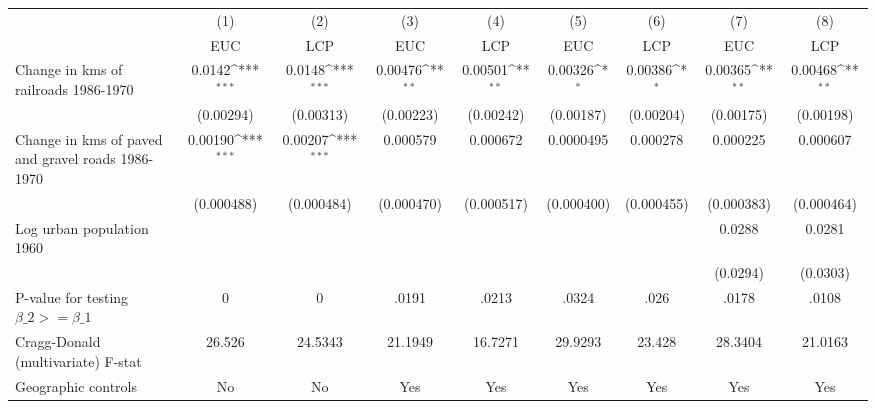 {
\def\sym#1{\ifmmode^{#1}\else\(^{#1}\)\fi}
\begin{tabular}{l*{8}{c}}
\hline\hline
                &\multicolumn{1}{c}{(1)}&\multicolumn{1}{c}{(2)}&\multicolumn{1}{c}{(3)}&\multicolumn{1}{c}{(4)}&\multicolumn{1}{c}{(5)}&\multicolumn{1}{c}{(6)}&\multicolumn{1}{c}{(7)}&\multicolumn{1}{c}{(8)}\\
                &\multicolumn{1}{c}{EUC}&\multicolumn{1}{c}{LCP}&\multicolumn{1}{c}{EUC}&\multicolumn{1}{c}{LCP}&\multicolumn{1}{c}{EUC}&\multicolumn{1}{c}{LCP}&\multicolumn{1}{c}{EUC}&\multicolumn{1}{c}{LCP}\\
\hline
Change in kms of railroads 1986-1970&   0.0142\sym{***}&   0.0148\sym{***}&  0.00476\sym{**} &  0.00501\sym{**} &  0.00326\sym{*}  &  0.00386\sym{*}  &  0.00365\sym{**} &  0.00468\sym{**} \\
                &(0.00294)         &(0.00313)         &(0.00223)         &(0.00242)         &(0.00187)         &(0.00204)         &(0.00175)         &(0.00198)         \\
[1em]
Change in kms of paved and gravel roads 1986-1970&  0.00190\sym{***}&  0.00207\sym{***}& 0.000579         & 0.000672         &0.0000495         & 0.000278         & 0.000225         & 0.000607         \\
                &(0.000488)         &(0.000484)         &(0.000470)         &(0.000517)         &(0.000400)         &(0.000455)         &(0.000383)         &(0.000464)         \\
[1em]
Log urban population 1960&                  &                  &                  &                  &                  &                  &   0.0288         &   0.0281         \\
                &                  &                  &                  &                  &                  &                  & (0.0294)         & (0.0303)         \\
\hline
P-value for testing $\beta\_{2} >= \beta\_{1}$&        0         &        0         &    .0191         &    .0213         &    .0324         &     .026         &    .0178         &    .0108         \\
Cragg-Donald (multivariate) F-stat&   26.526         &  24.5343         &  21.1949         &  16.7271         &  29.9293         &   23.428         &  28.3404         &  21.0163         \\
Geographic controls&       No         &       No         &      Yes         &      Yes         &      Yes         &      Yes         &      Yes         &      Yes         \\

\end{tabular}}
